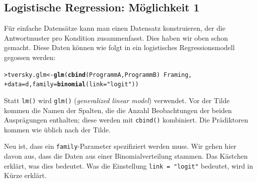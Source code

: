 \documentclass[oneside, 10pt]{book}\usepackage[]{graphicx}\usepackage[]{xcolor}
\makeatletter
\newcommand{\hlstr}[1]{\textcolor[rgb]{0.192,0.494,0.8}{#1}}%
\newcommand{\hlopt}[1]{\textcolor[rgb]{0,0,0}{#1}}%
\newcommand{\hlstd}[1]{\textcolor[rgb]{0.345,0.345,0.345}{#1}}%
\newcommand{\hlkwb}[1]{\textcolor[rgb]{0.69,0.353,0.396}{#1}}%
\newcommand{\hlkwc}[1]{\textcolor[rgb]{0.333,0.667,0.333}{#1}}%
\newcommand{\hlkwd}[1]{\textcolor[rgb]{0.737,0.353,0.396}{\textbf{#1}}}%
\newenvironment{kframe}{%
 \def\at@end@of@kframe{}%
 \ifinner\ifhmode%
  \def\at@end@of@kframe{\end{minipage}}%
  \begin{minipage}{\columnwidth}%
 \fi\fi%
 \def\FrameCommand##1{\hskip\@totalleftmargin \hskip-\fboxsep
 \colorbox{shadecolor}{##1}\hskip-\fboxsep
     \hskip-\linewidth \hskip-\@totalleftmargin \hskip\columnwidth}%
 \MakeFramed {\advance\hsize-\width
   \@totalleftmargin\z@ \linewidth\hsize
   \@setminipage}}%
 {\par\unskip\endMakeFramed%
 \at@end@of@kframe}
\newenvironment{knitrout}{}{} %
\makeatother
\begin{document}
\subsection{Logistische Regression: Möglichkeit 1}
Für einfache Datensätze kann man einen Datensatz konstruieren,
der die Antwortmuster pro Kondition zusammenfasst. Dies haben
wir oben schon gemacht. Diese Daten können wie folgt in ein
logistisches Regressionsmodell gegossen werden:

\begin{knitrout}
\color{fgcolor}\begin{kframe}
\begin{alltt}
\hlstd{> }\hlstd{tversky.glm} \hlkwb{<-} \hlkwd{glm}\hlstd{(}\hlkwd{cbind}\hlstd{(ProgrammA, ProgrammB)} \hlopt{~} \hlstd{Framing,}
\hlstd{+ }                   \hlkwc{data} \hlstd{= d,} \hlkwc{family} \hlstd{=} \hlkwd{binomial}\hlstd{(}\hlkwc{link} \hlstd{=} \hlstr{"logit"}\hlstd{))}
\end{alltt}
\end{kframe}
\end{knitrout}

Statt \texttt{lm()} wird \texttt{glm()} (\textit{generalized linear model})
verwendet. Vor der Tilde kommen die Namen der Spalten,
die die Anzahl Beobachtungen der beiden Ausprägungen enthalten;
diese werden mit \texttt{cbind()} kombiniert. Die Prädiktoren
kommen wie üblich nach der Tilde.

Neu ist, dass ein \texttt{family}-Parameter
spezifiziert werden muss.
Wir gehen hier davon aus, dass die Daten aus
einer Binomialverteilung stammen. Das Kästchen
erklärt, was dies bedeutet. Was die Einstellung
\texttt{link = "logit"} bedeutet, wird in Kürze erklärt.

\medskip
\end{document}
